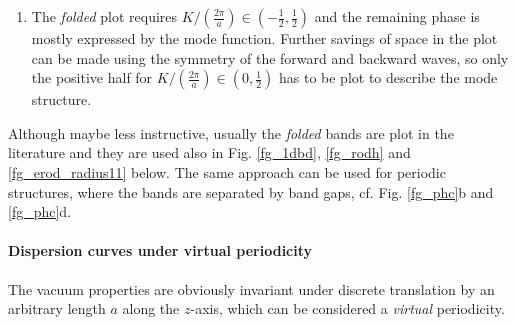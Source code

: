 {\begin{enumerate}
{In vacuum, the mode function takes the simplest form, being constant $\mathbf{u(\mathbf{r})} = 1$ at all frequencies. The dispersion relation of vacuum forms a direct line as plot in Fig. \ref{fg_phc}a.} 
 \item{The \textit{folded} plot requires $K/\left(\frac{2\pi}{a}\right) \in (-\frac{1}{2}, \frac{1}{2})$ and the remaining phase is mostly expressed by the mode function. 
Further savings of space in the plot can be made using the symmetry of the forward and backward waves, so only the positive half for $K/\left(\frac{2\pi}{a}\right) \in (0, \frac{1}{2})$ has to be plot to describe the mode structure.} 
 \end{enumerate}
Although maybe less instructive, usually the \textit{folded} bands are plot in the literature and they are used also in Fig. \ref{fg_1dbd}, \ref{fg_rodh} and \ref{fg_erod_radius11} below. The same approach can be used for periodic structures, where the bands are separated by band gaps, cf. Fig. \ref{fg_phc}b and \ref{fg_phc}d.
}
\paragraph{Dispersion curves under virtual periodicity}%
The vacuum properties are obviously invariant under discrete translation by an arbitrary length $a$ along the $z$-axis, which can be considered a \textit{virtual} periodicity. 

